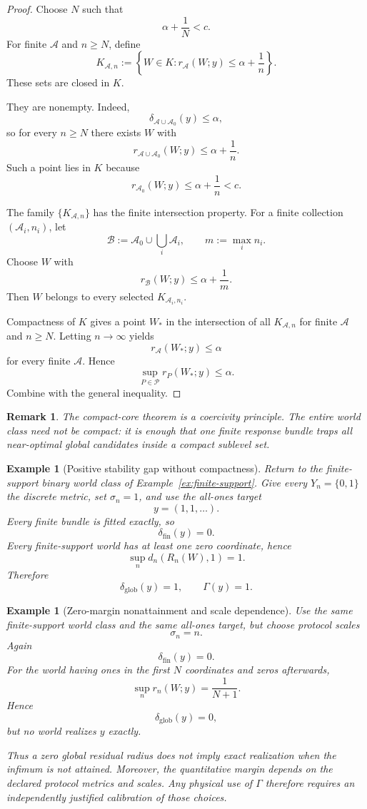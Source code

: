 \documentclass[11pt]{article}
\newtheorem{example}[definition]{Example}
\newtheorem{remark}[definition]{Remark}
\newcommand{\Pcal}{\mathcal P}
\newcommand{\Acal}{\mathcal A}
\newcommand{\Bcal}{\mathcal B}
\begin{document}
\begin{proof}
Choose $N$ such that
\[
\alpha+\frac1N<c.
\]
For finite $\Acal$ and $n\ge N$, define
\[
K_{\Acal,n}
:=
\left\{
W\in K:
r_{\Acal}(W;y)\le\alpha+\frac1n
\right\}.
\]
These sets are closed in $K$.

They are nonempty. Indeed,
\[
\delta_{\Acal\cup\Acal_0}(y)\le\alpha,
\]
so for every $n\ge N$ there exists $W$ with
\[
r_{\Acal\cup\Acal_0}(W;y)
\le
\alpha+\frac1n.
\]
Such a point lies in $K$ because
\[
r_{\Acal_0}(W;y)
\le
\alpha+\frac1n
<c.
\]

The family $\{K_{\Acal,n}\}$ has the finite intersection property. For a
finite collection $(\Acal_i,n_i)$, let
\[
\Bcal:=\Acal_0\cup\bigcup_i\Acal_i,
\qquad
m:=\max_i n_i.
\]
Choose $W$ with
\[
r_{\Bcal}(W;y)\le\alpha+\frac1m.
\]
Then $W$ belongs to every selected $K_{\Acal_i,n_i}$.

Compactness of $K$ gives a point $W_\ast$ in the intersection of all
$K_{\Acal,n}$ for finite $\Acal$ and $n\ge N$. Letting $n\to\infty$ yields
\[
r_{\Acal}(W_\ast;y)\le\alpha
\]
for every finite $\Acal$. Hence
\[
\sup_{P\in\Pcal}r_P(W_\ast;y)\le\alpha.
\]
Combine with the general inequality.
\end{proof}

\begin{remark}
The compact-core theorem is a coercivity principle. The entire world class
need not be compact: it is enough that one finite response bundle traps all
near-optimal global candidates inside a compact sublevel set.
\end{remark}

\begin{example}[Positive stability gap without compactness]
Return to the finite-support binary world class of
Example~\ref{ex:finite-support}. Give every $Y_n=\{0,1\}$ the discrete metric,
set $\sigma_n=1$, and use the all-ones target
\[
y=(1,1,\ldots).
\]
Every finite bundle is fitted exactly, so
\[
\delta_{\mathrm{fin}}(y)=0.
\]
Every finite-support world has at least one zero coordinate, hence
\[
\sup_n d_n(R_n(W),1)=1.
\]
Therefore
\[
\delta_{\mathrm{glob}}(y)=1,
\qquad
\Gamma(y)=1.
\]
\end{example}

\begin{example}[Zero-margin nonattainment and scale dependence]
Use the same finite-support world class and the same all-ones target, but choose
protocol scales
\[
\sigma_n=n.
\]
Again
\[
\delta_{\mathrm{fin}}(y)=0.
\]
For the world having ones in the first $N$ coordinates and zeros afterwards,
\[
\sup_n r_n(W;y)
=
\frac{1}{N+1}.
\]
Hence
\[
\delta_{\mathrm{glob}}(y)=0,
\]
but no world realizes $y$ exactly.

Thus a zero global residual radius does not imply exact realization when the
infimum is not attained. Moreover, the quantitative margin depends on the
declared protocol metrics and scales. Any physical use of $\Gamma$ therefore
requires an independently justified calibration of those choices.
\end{example}
\end{document}
